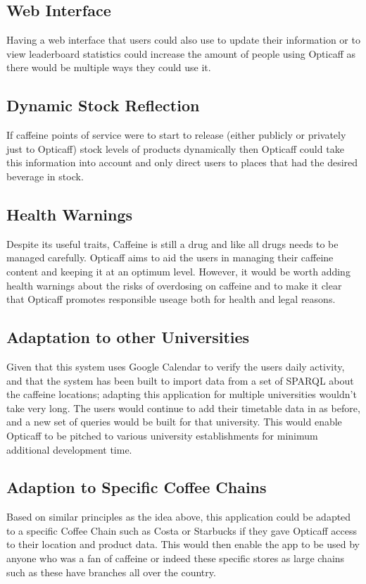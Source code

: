 \subsection{Web Interface}
Having a web interface that users could also use to update their information or to view leaderboard statistics could increase the amount of people using Opticaff as there would be multiple ways they could use it. 

\subsection{Dynamic Stock Reflection}
If caffeine points of service were to start to release (either publicly or privately just to Opticaff) stock levels of products dynamically then Opticaff could take this information into account and only direct users to places that had the desired beverage in stock. 
 
\subsection{Health Warnings}
Despite its useful traits, Caffeine is still a drug and like all drugs needs to be managed carefully. Opticaff aims to aid the users in managing their caffeine content and keeping it at an optimum level. However, it would be worth adding health warnings about the risks of overdosing on caffeine and to make it clear that Opticaff promotes responsible useage both for health and legal reasons. 

\subsection{Adaptation to other Universities}
Given that this system uses Google Calendar to verify the users daily activity, and that the system has been built to import data from a set of SPARQL about the caffeine locations; adapting this application for multiple universities wouldn't take very long. The users would continue to add their timetable data in as before, and a new set of queries would be built for that university. This would enable Opticaff to be pitched to various university establishments for minimum additional development time. 

\subsection{Adaption to Specific Coffee Chains}
Based on similar principles as the idea above, this application could be adapted to a specific Coffee Chain such as Costa or Starbucks if they gave Opticaff access to their location and product data. This would then enable the app to be used by anyone who was a fan of caffeine or indeed these specific stores as large chains such as these have branches all over the country.

